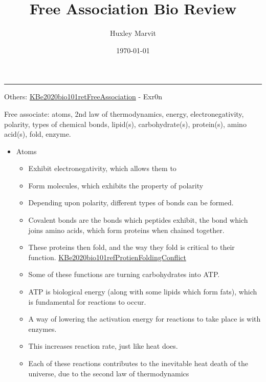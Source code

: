 \documentclass[letterpaper]{article}
\author{Huxley Marvit}
\date{\today}
\title{Free Association Bio Review}
\renewcommand{\tableofcontents}{}
\begin{document}
\tableofcontents

\noindent\rule{\textwidth}{0.5pt}

Others:
\href{KBe2020bio101retFreeAssociation.org}{KBe2020bio101retFreeAssociation} -
Exr0n

Free associate: atoms, 2nd law of thermodynamics, energy,
electronegativity, polarity, types of chemical bonds, lipid(s),
carbohydrate(s), protein(s), amino acid(s), fold, enzyme.

\begin{itemize}
\item Atoms

\begin{itemize}
\item Exhibit electronegativity, which allows them to
\item Form molecules, which exhibits the property of polarity
\item Depending upon polarity, different types of bonds can be formed.
\item Covalent bonds are the bonds which peptides exhibit, the bond which
joins amino acids, which form proteins when chained together.
\item These proteins then fold, and the way they fold is critical to their
function.
\href{KBe2020bio101refProtienFoldingConflict.org}{KBe2020bio101refProtienFoldingConflict}
\item Some of these functions are turning carbohydrates into ATP.
\item ATP is biological energy (along with some lipids which form fats),
which is fundamental for reactions to occur.
\item A way of lowering the activation energy for reactions to take place
is with enzymes.
\item This increases reaction rate, just like heat does.
\item Each of these reactions contributes to the inevitable heat death of
the universe, due to the second law of thermodynamics
\end{itemize}
\end{itemize}
\end{document}

